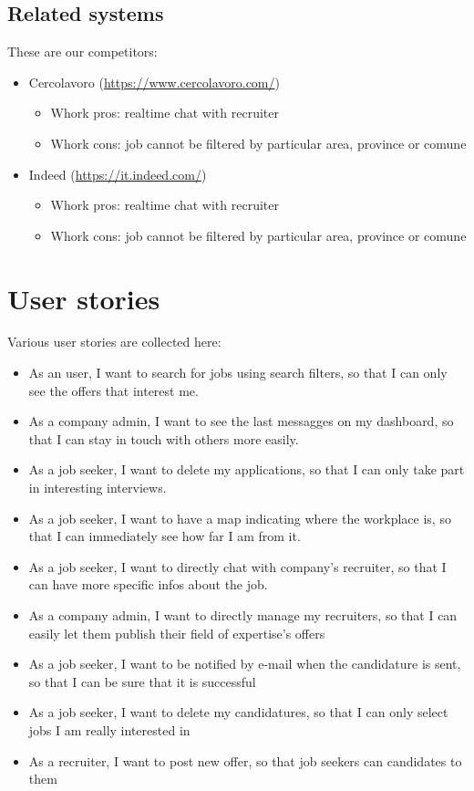 \documentclass[12pt, a4paper]{article}
\begin{document}
\subsection{Related systems}
These are our competitors:
\begin{itemize}
	\item Cercolavoro (\url{https://www.cercolavoro.com/})
	\begin{itemize}
		\item Whork pros: realtime chat with recruiter
		\item Whork cons: job cannot be filtered by particular area, province or comune
	\end{itemize}
	\item Indeed (\url{https://it.indeed.com/})
	\begin{itemize}
		\item Whork pros: realtime chat with recruiter
		\item Whork cons: job cannot be filtered by particular area, province or comune
	\end{itemize}
\end{itemize}

\section{User stories}
Various user stories are collected here:
\begin{itemize}
	\item As an user, I want to search for jobs using search filters,
		so that I can only see the offers that interest me.
	\item As a company admin, I want to see the last messagges on my dashboard, so that I can 
		stay in touch with others more easily.      
	\item As a job seeker, I want to delete my applications, so that I can only take part in interesting interviews.
	\item As a job seeker, I want to have a map indicating where the workplace is,
		so that I can immediately see how far I am from it.
	\item As a job seeker, I want to directly chat with company's recruiter,
		so that I can have more specific infos about the job.
	\item As a company admin, I want to directly manage my recruiters,
		so that I can easily let them publish their field of expertise's offers
	\item As a job seeker, I want to be notified by e-mail when the candidature is sent, 
		so that I can be sure that it is successful
	\item As a job seeker, I want to delete my candidatures, 
		so that I can only select jobs I am really interested in
	\item As a recruiter, I want to post new offer, so that job seekers can candidates to them
\end{itemize}
\end{document}
